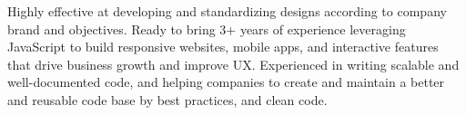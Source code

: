 Highly effective at developing and standardizing designs according to company brand and objectives. Ready to
bring 3+ years of experience leveraging JavaScript to build responsive websites, mobile apps, and interactive
features that drive business growth and improve UX. Experienced
in writing scalable and well-documented code, and helping companies to create and maintain a better
and reusable code base by best practices, and clean code. 

